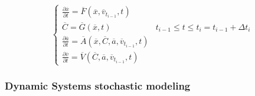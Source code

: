 \begin{equation}
\label{eq:auxiliaryVariables}
\left\{\begin{matrix}
\frac{\partial \overline{x} }{\partial t} = \overline{F}\left (  \overline{x},\overline{v}_{t_{i-1}}, t \right )  & \\ 
\overline{C} =  \overline{G}(\overline{x},t)  & t_{i-1} \leq t \leq  t_{i} =  t_{i-1} + \Delta  t_{i}\: \\ 
\frac{\partial \overline{a} }{\partial t} = \overline{A}\left (  \overline{x},\overline{C},\overline{a},\overline{v}_{t_{i-1}}, t \right ) \\
\frac{\partial \overline{v} }{\partial t} = \overline{V}\left (  \overline{C},\overline{a}, \overline{v}_{t_{i-1}}, t \right )  & 
\end{matrix}\right.
\end{equation}

\subsubsection{Dynamic Systems stochastic modeling}
%
